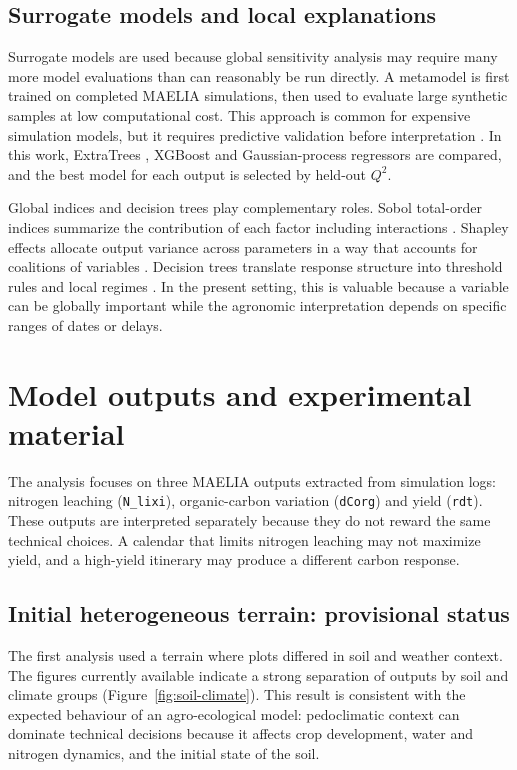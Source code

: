 \documentclass[11pt,a4paper]{article}
\newcommand{\param}[1]{\texttt{#1}}
\begin{document}
\subsection{Surrogate models and local explanations}

Surrogate models are used because global sensitivity analysis may require many more model evaluations than can reasonably be run directly. A metamodel is first trained on completed MAELIA simulations, then used to evaluate large synthetic samples at low computational cost. This approach is common for expensive simulation models, but it requires predictive validation before interpretation \citep{angione2022surrogate,saves2026mabs}. In this work, ExtraTrees \citep{geurts2006extremely}, XGBoost \citep{chen2016xgboost} and Gaussian-process regressors \citep{rasmussen2006gaussian} are compared, and the best model for each output is selected by held-out $Q^2$.

Global indices and decision trees play complementary roles. Sobol total-order indices summarize the contribution of each factor including interactions \citep{sobol2001global,saltelli2002best}. Shapley effects allocate output variance across parameters in a way that accounts for coalitions of variables \citep{shapley1953value,song2016shapley}. Decision trees translate response structure into threshold rules and local regimes \citep{breiman1984cart}. In the present setting, this is valuable because a variable can be globally important while the agronomic interpretation depends on specific ranges of dates or delays.

\section{Model outputs and experimental material}

The analysis focuses on three MAELIA outputs extracted from simulation logs: nitrogen leaching (\param{N\_lixi}), organic-carbon variation (\param{dCorg}) and yield (\param{rdt}). These outputs are interpreted separately because they do not reward the same technical choices. A calendar that limits nitrogen leaching may not maximize yield, and a high-yield itinerary may produce a different carbon response.

\subsection{Initial heterogeneous terrain: provisional status}

The first analysis used a terrain where plots differed in soil and weather context. The figures currently available indicate a strong separation of outputs by soil and climate groups (Figure~\ref{fig:soil-climate}). This result is consistent with the expected behaviour of an agro-ecological model: pedoclimatic context can dominate technical decisions because it affects crop development, water and nitrogen dynamics, and the initial state of the soil.
\end{document}
